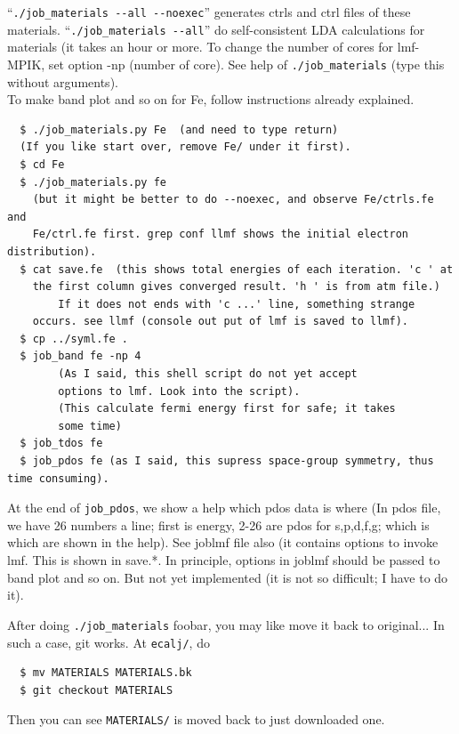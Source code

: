 ``\verb+./job_materials --all --noexec+'' generates ctrls and ctrl files of
these materials. ``\verb+./job_materials --all+'' do self-consistent
LDA calculations for materials (it takes an hour or more. To change the
number of cores for lmf-MPIK, set option -np (number of core). See
help of \verb+./job_materials+ (type this without arguments).\\

To make band plot and so on for Fe, follow instructions already explained.
\begin{verbatim}
  $ ./job_materials.py Fe  (and need to type return)
  (If you like start over, remove Fe/ under it first).
  $ cd Fe
  $ ./job_materials.py fe
    (but it might be better to do --noexec, and observe Fe/ctrls.fe and
	Fe/ctrl.fe first. grep conf llmf shows the initial electron distribution).
  $ cat save.fe  (this shows total energies of each iteration. 'c ' at
	the first column gives converged result. 'h ' is from atm file.)
        If it does not ends with 'c ...' line, something strange
	occurs. see llmf (console out put of lmf is saved to llmf).
  $ cp ../syml.fe .
  $ job_band fe -np 4 
        (As I said, this shell script do not yet accept
	    options to lmf. Look into the script).
        (This calculate fermi energy first for safe; it takes
	    some time)       
  $ job_tdos fe
  $ job_pdos fe (as I said, this supress space-group symmetry, thus time consuming).
\end{verbatim}
At the end of \verb+job_pdos+, we show a help which pdos data is where
(In pdos file, we have 26 numbers a line; first is energy, 2-26 are pdos
for s,p,d,f,g; which is which are shown in the help).
See joblmf file also (it contains options to invoke lmf. This is shown
in save.*. In principle, options in joblmf should be passed to band plot
and so on. But not yet implemented 
(it is not so difficult; I have to do it).

After doing \verb+./job_materials+ foobar, you may like move it back to
original... In such a case, git works. At \verb+ecalj/+, do
\begin{verbatim}
  $ mv MATERIALS MATERIALS.bk
  $ git checkout MATERIALS
\end{verbatim}
Then you can see \verb+MATERIALS/+ is moved back to just downloaded one.



